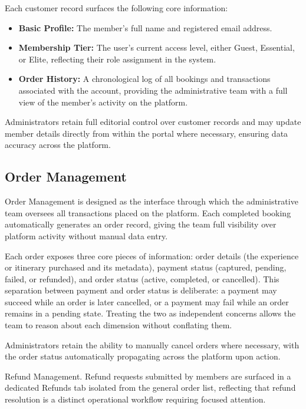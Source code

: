 Each customer record surfaces the following core information:
\begin{itemize}
    \item \textbf{Basic Profile:} The member's full name and registered email address.
    \item \textbf{Membership Tier:} The user's current access level, either Guest, Essential, or Elite, reflecting their role assignment in the system.
    \item \textbf{Order History:} A chronological log of all bookings and transactions associated with the account, providing the administrative team with a full view of the member's activity on the platform.
\end{itemize}
Administrators retain full editorial control over customer records and may update member details directly from within the portal where necessary, ensuring data accuracy across the platform.

\subsection{Order Management}
\label{subsection:Order Management}
Order Management is designed as the interface through which the administrative team oversees all transactions placed on the platform. Each completed booking automatically generates an order record, giving the team full visibility over platform activity without manual data entry.

Each order exposes three core pieces of information: order details (the experience or itinerary purchased and its metadata), payment status (captured, pending, failed, or refunded), and order status (active, completed, or cancelled). This separation between payment and order status is deliberate: a payment may succeed while an order is later cancelled, or a payment may fail while an order remains in a pending state. Treating the two as independent concerns allows the team to reason about each dimension without conflating them.

Administrators retain the ability to manually cancel orders where necessary, with the order status automatically propagating across the platform upon action.

Refund Management. Refund requests submitted by members are surfaced in a dedicated Refunds tab isolated from the general order list, reflecting that refund resolution is a distinct operational workflow requiring focused attention. 

